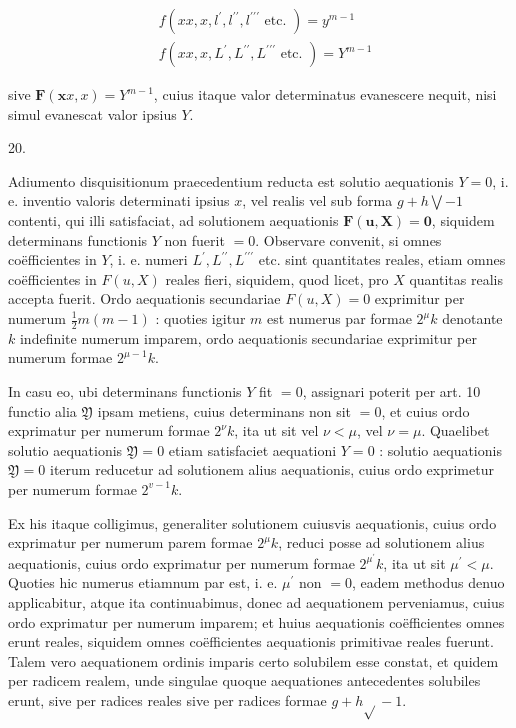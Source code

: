 \documentclass[10pt]{article}
\begin{document}
\[
\begin{aligned}
& f\left(x x, x, l^{\prime}, l^{\prime \prime}, l^{\prime \prime \prime} \text { etc. }\right)=y^{m-1} \\
& f\left(x x, x, L^{\prime}, L^{\prime \prime}, L^{\prime \prime \prime} \text { etc. }\right)=Y^{m-1}
\end{aligned}
\]

sive \(\boldsymbol{F}(\boldsymbol{x} x, x)=Y^{m-1}\), cuius itaque valor determinatus evanescere nequit, nisi simul evanescat valor ipsius \(Y\).

20.

Adiumento disquisitionum praecedentium reducta est solutio aequationis \(Y=0\), i. e. inventio valoris determinati ipsius \(x\), vel realis vel sub forma \(g+h \bigvee-1\) contenti, qui illi satisfaciat, ad solutionem aequationis \(\boldsymbol{F}(\boldsymbol{u}, \mathbf{X})=\mathbf{0}\),
siquidem determinans functionis \(Y\) non fuerit \(=0\). Observare convenit, si omnes coëfficientes in \(Y\), i. e. numeri \(L^{\prime}, L^{\prime \prime}, L^{\prime \prime \prime}\) etc. sint quantitates reales, etiam omnes coëfficientes in \(F(u, X)\) reales fieri, siquidem, quod licet, pro \(X\) quantitas realis accepta fuerit. Ordo aequationis secundariae \(F(u, X)=0\) exprimitur per numerum \(\frac{1}{2} m(m-1)\) : quoties igitur \(m\) est numerus par formae \(2^{\mu} k\) denotante \(k\) indefinite numerum imparem, ordo aequationis secundariae exprimitur per numerum formae \(2^{\mu-1} k\).

In casu eo, ubi determinans functionis \(Y\) fit \(=0\), assignari poterit per art. 10 functio alia \(\mathfrak{Y}\) ipsam metiens, cuius determinans non sit \(=0\), et cuius ordo exprimatur per numerum formae \(2^{\nu} k\), ita ut sit vel \(\nu<\mu\), vel \(\nu=\mu\). Quaelibet solutio aequationis \(\mathfrak{Y}=0\) etiam satisfaciet aequationi \(Y=0\) : solutio aequationis \(\mathfrak{Y}=0\) iterum reducetur ad solutionem alius aequationis, cuius ordo exprimetur per numerum formae \(2^{v-1} k\).

Ex his itaque colligimus, generaliter solutionem cuiusvis aequationis, cuius ordo exprimatur per numerum parem formae \(2^{\mu} k\), reduci posse ad solutionem alius aequationis, cuius ordo exprimatur per numerum formae \(2^{\mu^{\prime}} k\), ita ut sit \(\mu^{\prime}<\mu\). Quoties hic numerus etiamnum par est, i. e. \(\mu^{\prime}\) non \(=0\), eadem methodus denuo applicabitur, atque ita continuabimus, donec ad aequationem perveniamus, cuius ordo exprimatur per numerum imparem; et huius aequationis coëfficientes omnes erunt reales, siquidem omnes coëfficientes aequationis primitivae reales fuerunt. Talem vero aequationem ordinis imparis certo solubilem esse constat, et quidem per radicem realem, unde singulae quoque aequationes antecedentes solubiles erunt, sive per radices reales sive per radices formae \(g+h \sqrt{ }-1\).
\end{document}
